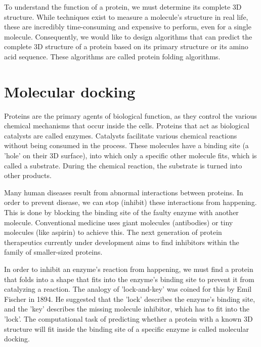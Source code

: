 To understand the function of a protein, we must determine its complete 3D structure. While techniques exist to measure a molecule's structure in real life, these are incredibly time-consuming and expensive to perform, even for a single molecule. Consequently, we would like to design algorithms that can predict the complete 3D structure of a protein based on its primary structure or its amino acid sequence. These algorithms are called protein folding algorithms.

\section{Molecular docking}

Proteins are the primary agents of biological function, as they control the various chemical mechanisms that occur inside the cells. Proteins that act as biological catalysts are called enzymes. Catalysts facilitate various chemical reactions without being consumed in the process. These molecules have a binding site (a 'hole' on their 3D surface), into which only a specific other molecule fits, which is called a substrate. During the chemical reaction, the substrate is turned into other products.  \cite{fionda_networks_2019}

Many human diseases result from abnormal interactions between proteins. In order to prevent disease, we can stop (inhibit) these interactions from happening. This is done by blocking the binding site of the faulty enzyme with another molecule. Conventional medicine uses giant molecules (antibodies) or tiny molecules (like aspirin) to achieve this. The next generation of protein therapeutics currently under development aims to find inhibitors within the family of smaller-sized proteins.
 \cite{ryan_proteinprotein_2005}

In order to inhibit an enzyme's reaction from happening, we must find a protein that folds into a shape that fits into the enzyme's binding site to prevent it from catalyzing a reaction. The analogy of 'lock-and-key' was coined for this by Emil Fischer in 1894. He suggested that the 'lock' describes the enzyme's binding site, and the 'key' describes the missing molecule inhibitor, which has to fit into the 'lock'. \cite{a_molecular_2018} \cite{walker_molecular_2008} The computational task of predicting whether a protein with a known 3D structure will fit inside the binding site of a specific enzyme is called molecular docking.

